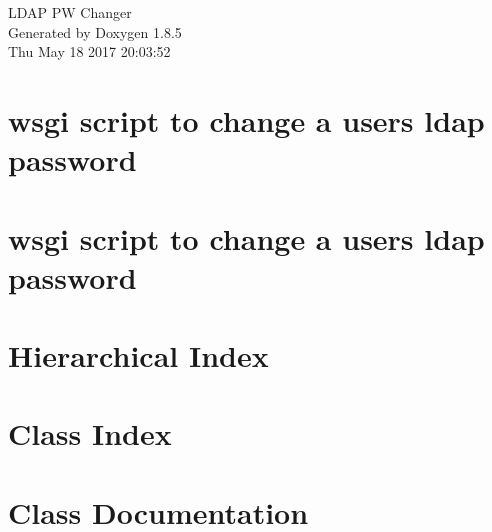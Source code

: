 \documentclass[twoside]{book}
\newcommand{\clearemptydoublepage}{%
  \newpage{\pagestyle{empty}\cleardoublepage}%
}
\begin{document}
\hypersetup{pageanchor=false}
\begin{titlepage}
\vspace*{7cm}
\begin{center}%
{\Large L\-D\-A\-P P\-W Changer }\\
\vspace*{1cm}
{\large Generated by Doxygen 1.8.5}\\
\vspace*{0.5cm}
{\small Thu May 18 2017 20:03:52}\\
\end{center}
\end{titlepage}
\clearemptydoublepage
\tableofcontents
\clearemptydoublepage
{}
\hypersetup{pageanchor=true}

\chapter{wsgi script to change a users ldap password}
\label{md__home_war_git_bmb_ldap_pwchange_package_pk_README}
\hypertarget{md__home_war_git_bmb_ldap_pwchange_package_pk_README}{}

\chapter{wsgi script to change a users ldap password}
\label{md__home_war_git_bmb_ldap_pwchange_README}
\hypertarget{md__home_war_git_bmb_ldap_pwchange_README}{}

\chapter{Hierarchical Index}

\chapter{Class Index}

\chapter{Class Documentation}















\newpage
{}
{}
\printindex
\end{document}

